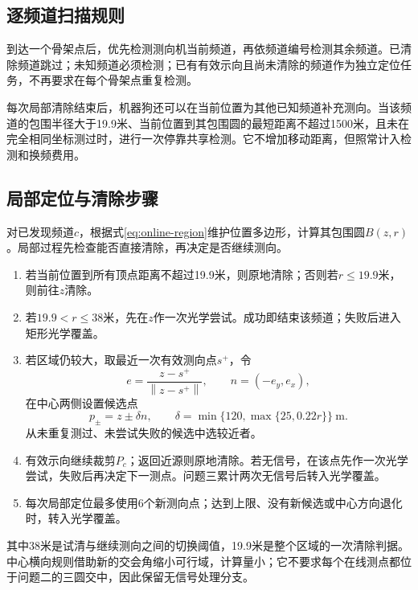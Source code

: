 \documentclass[UTF8,fontset=fandol,a4paper,zihao=-4]{ctexart}
\newcommand{\norm}[1]{\left\lVert#1\right\rVert}
\begin{document}
\subsection{逐频道扫描规则}
到达一个骨架点后，优先检测测向机当前频道，再依频道编号检测其余频道。已清除频道跳过；未知频道必须检测；已有有效示向且尚未清除的频道作为独立定位任务，不再要求在每个骨架点重复检测。

每次局部清除结束后，机器狗还可以在当前位置为其他已知频道补充测向。当该频道的包围半径大于19.9米、当前位置到其包围圆的最短距离不超过1500米，且未在完全相同坐标测过时，进行一次停靠共享检测。它不增加移动距离，但照常计入检测和换频费用。

\subsection{局部定位与清除步骤}\label{subsec:localization}
对已发现频道$c$，根据式\eqref{eq:online-region}维护位置多边形，计算其包围圆$B(z,r)$。局部过程先检查能否直接清除，再决定是否继续测向。
\begin{enumerate}
\item 若当前位置到所有顶点距离不超过19.9米，则原地清除；否则若$r\le19.9$米，则前往$z$清除。
\item 若$19.9<r\le38$米，先在$z$作一次光学尝试。成功即结束该频道；失败后进入矩形光学覆盖。
\item 若区域仍较大，取最近一次有效测向点$s^+$，令
\[
e=\frac{z-s^+}{\norm{z-s^+}},\qquad n=(-e_y,e_x),
\]
在中心两侧设置候选点
\begin{equation}\label{eq:flank}
p_\pm=z\pm\delta n,\qquad
\delta=\min\{120,\max\{25,0.22r\}\}\ \mathrm m.
\end{equation}
从未重复测过、未尝试失败的候选中选较近者。
\item 有效示向继续裁剪$P_c$；返回近源则原地清除。若无信号，在该点先作一次光学尝试，失败后再决定下一测点。问题三累计两次无信号后转入光学覆盖。
\item 每次局部定位最多使用6个新测向点；达到上限、没有新候选或中心方向退化时，转入光学覆盖。
\end{enumerate}
其中38米是试清与继续测向之间的切换阈值，19.9米是整个区域的一次清除判据。中心横向规则借助新的交会角缩小可行域，计算量小；它不要求每个在线测点都位于问题二的三圆交中，因此保留无信号处理分支。
\end{document}
